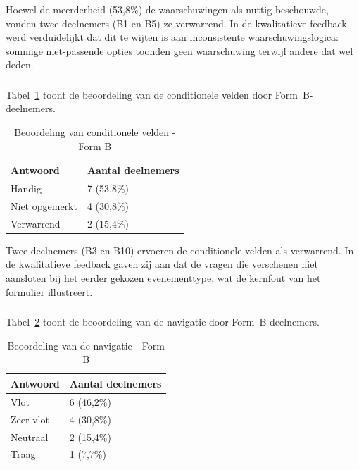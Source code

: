 Hoewel de meerderheid (53,8\%) de waarschuwingen als nuttig beschouwde, vonden twee deelnemers (B1 en B5) ze verwarrend. In de kwalitatieve feedback werd verduidelijkt dat dit te wijten is aan inconsistente waarschuwingslogica: sommige niet-passende opties toonden geen waarschuwing terwijl andere dat wel deden.

\subsubsection{}

Tabel~\ref{tab:vroeg-formb-conditioneel} toont de beoordeling van de conditionele velden door Form~B-deelnemers.

\begin{table}[h]
  \centering
  \caption[Beoordeling conditionele velden vroege test Form B]{Beoordeling van conditionele velden - Form B}
  \label{tab:vroeg-formb-conditioneel}
  \begin{tabular}{ll}
    \hline
    \textbf{Antwoord} & \textbf{Aantal deelnemers} \\
    \hline
    Handig         & 7 (53,8\%) \\
    Niet opgemerkt & 4 (30,8\%) \\
    Verwarrend     & 2 (15,4\%) \\
    \hline
  \end{tabular}
\end{table}

Twee deelnemers (B3 en B10) ervoeren de conditionele velden als verwarrend. In de kwalitatieve feedback gaven zij aan dat de vragen die verschenen niet aansloten bij het eerder gekozen evenementtype, wat de kernfout van het formulier illustreert.

\subsubsection{}

Tabel~\ref{tab:vroeg-formb-navigatie} toont de beoordeling van de navigatie door Form~B-deelnemers.

\begin{table}[h]
  \centering
  \caption[Beoordeling navigatie vroege test Form B]{Beoordeling van de navigatie - Form B}
  \label{tab:vroeg-formb-navigatie}
  \begin{tabular}{ll}
    \hline
    \textbf{Antwoord} & \textbf{Aantal deelnemers} \\
    \hline
    Vlot      & 6 (46,2\%) \\
    Zeer vlot & 4 (30,8\%) \\
    Neutraal  & 2 (15,4\%) \\
    Traag     & 1 (7,7\%)  \\
    \hline
  \end{tabular}
\end{table}

